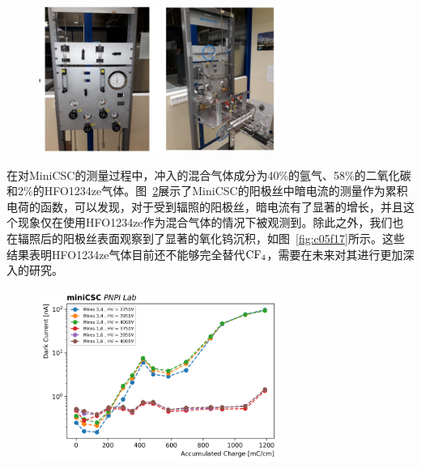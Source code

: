 \begin{figure}[!htbp]
    \centering
    \includegraphics[width=0.7\textwidth]{figures/chapter05/MiniCSC_GasMixer.png}
    \label{fig:c05f15}
\end{figure}

在对MiniCSC的测量过程中，冲入的混合气体成分为40\%的氩气、58\%的二氧化碳和2\%的HFO1234ze气体。图~\ref{fig:c05f16}展示了MiniCSC的阳极丝中暗电流的测量作为累积电荷的函数，可以发现，对于受到辐照的阳极丝，暗电流有了显著的增长，并且这个现象仅在使用HFO1234ze作为混合气体的情况下被观测到。除此之外，我们也在辐照后的阳极丝表面观察到了显著的氧化钨沉积，如图~\ref{fig:c05f17}所示。这些结果表明HFO1234ze气体目前还不能够完全替代$\mathrm{CF_4}$，需要在未来对其进行更加深入的研究。

\begin{figure}[!htbp]
    \centering
    \includegraphics[width=0.7\textwidth]{figures/chapter05/MiniCSC_darkcurrent.png}
    \label{fig:c05f16}
\end{figure}

